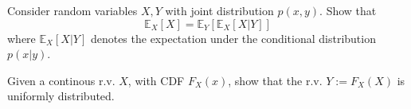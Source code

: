\begin{question}
\label{q:mml-6.11}

Consider random variables $X,Y$ with joint distribution $p(x,y)$. Show that
\begin{equation}
\mathbb{E}_X[X]= \mathbb{E}_Y[\mathbb{E}_X [X|Y]]
\end{equation}
where $\mathbb{E}_X [X|Y]$ denotes the expectation under the conditional distribution $p(x|y)$.
\end{question}

\begin{question}
\label{q:mml-6.13}

Given a continous r.v. $X$, with CDF $F_X(x)$, show that the r.v. $Y:=F_X(X)$ is uniformly distributed.

\end{question}

%
%
